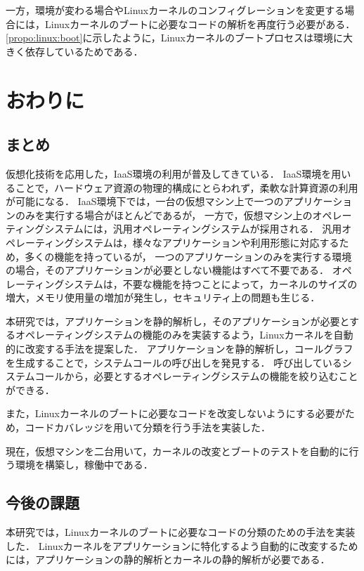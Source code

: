 \documentclass[graduation-thesis]{mlarticle}
\begin{document}
一方，環境が変わる場合やLinuxカーネルのコンフィグレーションを変更する場合には，Linuxカーネルのブートに必要なコードの解析を再度行う必要がある．
\ref{propo:linux:boot}に示したように，Linuxカーネルのブートプロセスは環境に大きく依存しているためである．

\clearpage
\section{おわりに}
\label{conclusion}
\subsection{まとめ}
仮想化技術を応用した，IaaS環境の利用が普及してきている．
IaaS環境を用いることで，ハードウェア資源の物理的構成にとらわれず，柔軟な計算資源の利用が可能になる．
IaaS環境下では，一台の仮想マシン上で一つのアプリケーションのみを実行する場合がほとんどであるが，
一方で，仮想マシン上のオペレーティングシステムには，汎用オペレーティングシステムが採用される．
汎用オペレーティングシステムは，様々なアプリケーションや利用形態に対応するため，多くの機能を持っているが，
一つのアプリケーションのみを実行する環境の場合，そのアプリケーションが必要としない機能はすべて不要である．
オペレーティングシステムは，不要な機能を持つことによって，カーネルのサイズの増大，メモリ使用量の増加が発生し，セキュリティ上の問題も生じる．

本研究では，アプリケーションを静的解析し，そのアプリケーションが必要とするオペレーティングシステムの機能のみを実装するよう，Linuxカーネルを自動的に改変する手法を提案した．
アプリケーションを静的解析し，コールグラフを生成することで，システムコールの呼び出しを発見する．
呼び出しているシステムコールから，必要とするオペレーティングシステムの機能を絞り込むことができる．

また，Linuxカーネルのブートに必要なコードを改変しないようにする必要がため，コードカバレッジを用いて分類を行う手法を実装した．

現在，仮想マシンを二台用いて，カーネルの改変とブートのテストを自動的に行う環境を構築し，稼働中である．

\subsection{今後の課題}

本研究では，Linuxカーネルのブートに必要なコードの分類のための手法を実装した．
Linuxカーネルをアプリケーションに特化するよう自動的に改変するためには，アプリケーションの静的解析とカーネルの静的解析が必要である．
\end{document}
